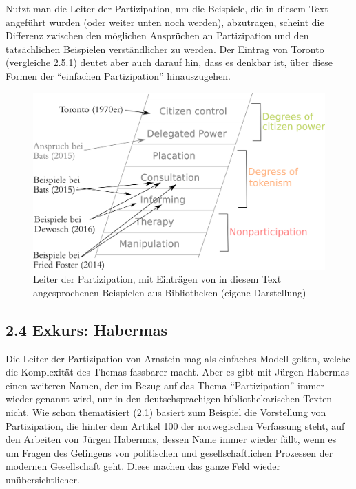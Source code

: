 \documentclass[a4paper,
fontsize=11pt,
oneside,
numbers=noperiodatend,
parskip=half-,
bibliography=totoc,
final
]{scrartcl}
\begin{document}
Nutzt man die Leiter der Partizipation, um die Beispiele, die in diesem
Text angeführt wurden (oder weiter unten noch werden), abzutragen,
scheint die Differenz zwischen den möglichen Ansprüchen an Partizipation
und den tatsächlichen Beispielen verständlicher zu werden. Der Eintrag
von Toronto (vergleiche 2.5.1) deutet aber auch darauf hin, dass es
denkbar ist, über diese Formen der \enquote{einfachen Partizipation}
hinauszugehen.

\begin{figure}
\centering
\includegraphics{img/Ladder-of-Citizen-Participation-mitEintraegen.jpg}
\caption{Leiter der Partizipation, mit Einträgen von in diesem Text
angesprochenen Beispielen aus Bibliotheken (eigene Darstellung)}
\end{figure}

\hypertarget{exkurs-habermas}{%
\subsection{2.4 Exkurs: Habermas}\label{exkurs-habermas}}

Die Leiter der Partizipation von Arnstein mag als einfaches Modell
gelten, welche die Komplexität des Themas fassbarer macht. Aber es gibt
mit Jürgen Habermas einen weiteren Namen, der im Bezug auf das Thema
\enquote{Partizipation} immer wieder genannt wird, nur in den
deutschsprachigen bibliothekarischen Texten nicht. Wie schon
thematisiert (2.1) basiert zum Beispiel die Vorstellung von
Partizipation, die hinter dem Artikel 100 der norwegischen Verfassung
steht, auf den Arbeiten von Jürgen Habermas, dessen Name immer wieder
fällt, wenn es um Fragen des Gelingens von politischen und
gesellschaftlichen Prozessen der modernen Gesellschaft geht. Diese
machen das ganze Feld wieder unübersichtlicher.
\end{document}
